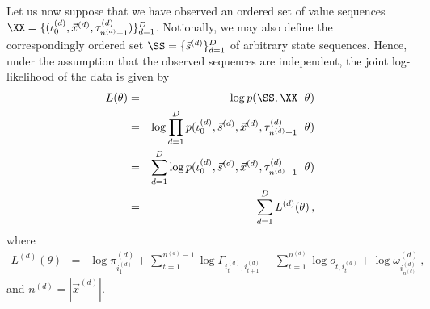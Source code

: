\documentclass[a4paper]{article}
\begin{document}
Let us now suppose that we have observed an ordered set of value sequences
$\XX=\{(\iota_0^{(d)},\vec{x}^{(d)},\tau_{n^{(d)}+1}^{(d)})\}_{d=1}^{D}$.
Notionally, we may also define the correspondingly ordered set $\SS=\{\vec{s}^{(d)}\}_{d=1}^D$
of arbitrary state sequences.
Hence, under the assumption that the observed sequences are independent, the joint log-likelihood of the data is given by
\begin{eqnarray}
  L(\theta) & = & \log p(\SS,\XX\,|\,\theta) 
\nonumber\\& = & 
\log\prod_{d=1}^D 
p(\iota_0^{(d)},\vec{s}^{(d)},\vec{x}^{(d)},\tau_{n^{(d)}+1}^{(d)}\,|\,\theta) 
\nonumber\\& = & 
\sum_{d=1}^D\log 
p(\iota_0^{(d)},\vec{s}^{(d)},\vec{x}^{(d)},\tau_{n^{(d)}+1}^{(d)}\,|\,\theta) 
\nonumber\\& = & 
\sum_{d=1}^D L^{(d)}(\theta)
\,,
\end{eqnarray}
where
\begin{eqnarray}
  L^{(d)}(\theta) & = &
   \log\pi_{i_1^{(d)}}^{(d)}
 + \sum_{t=1}^{n^{(d)}-1}\log\Gamma_{i_t^{(d)},i_{t+1}^{(d)}}
 + \sum_{t=1}^{n^{(d)}}\log o_{t,i_t^{(d)}}
 + \log\omega_{i_{n^{(d)}}^{(d)}}^{(d)}
\,,
\end{eqnarray}
and $n^{(d)}=|\vec{x}^{(d)}|$.
\end{document}
